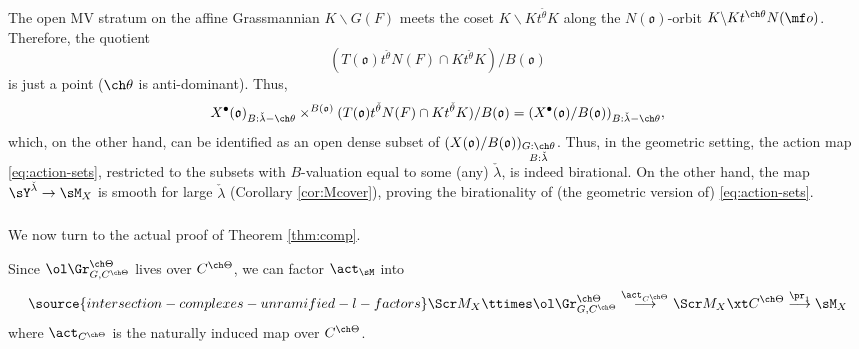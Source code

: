 The open MV stratum on the affine Grassmannian $K\backslash G(F)$ meets the coset $K\backslash K t^{\check\theta} K$ along the $N(\mathfrak o)$-orbit $K \backslash K t^{\ch\theta} N(\mf o)$. Therefore, the quotient
\[(T(\mathfrak o)t^{\check\theta} N(F) \cap K t^{\check\theta} K)/B(\mathfrak o)\]
is just a point ($\ch\theta$ is anti-dominant).
Thus,
\[X^\bullet(\mathfrak o)_{B:\check\lambda-\ch\theta} \times^{B(\mathfrak o)} (T(\mathfrak o) t^{\check\theta} N(F) \cap K t^{\check\theta} K)/B(\mathfrak o) = (X^\bullet(\mathfrak o)/B(\mathfrak o))_{B:\check\lambda-\ch\theta},\]
which, on the other hand, can be identified as an open dense subset of $(X(\mathfrak o)/B(\mathfrak o))_{\substack{G:\ch\theta \\ B:\check\lambda}}$. Thus, in the geometric setting, the action map \eqref{eq:action-sets}, restricted to the subsets with $B$-valuation equal to some (any) $\check\lambda$, is indeed birational. On the other hand, the map $\sY^{\check\lambda}\to \sM_X$ is smooth for large $\check\lambda$ (Corollary \ref{cor:Mcover}), proving the birationality of (the geometric version of) \eqref{eq:action-sets}.








\subsubsection{}

We now turn to the actual proof of Theorem \ref{thm:comp}.

Since $\ol\Gr^{\ch\Theta}_{G,C^{\ch\Theta}}$ lives over $C^{\ch\Theta}$,
we can factor $\act_\sM$ into
\begin{equation} \label{e:actC}
\source{intersection-complexes-unramified-l-factors}
    \Scr M_X \ttimes \ol\Gr^{\ch\Theta}_{G,C^{\ch\Theta}} \overset{\act_{C^{\ch\Theta}}}\longrightarrow \Scr M_X \xt C^{\ch\Theta}
\overset{\pr_1}\longrightarrow \sM_X
\end{equation}
where $\act_{C^{\ch\Theta}}$ is the naturally induced map over $C^{\ch\Theta}$.


